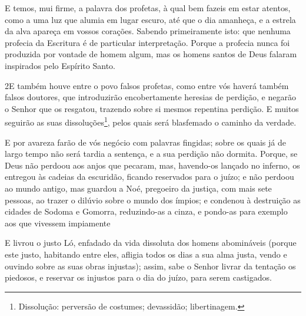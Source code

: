 E temos, mui firme, a palavra dos profetas, à qual bem fazeis em
estar atentos, como a uma luz que alumia em lugar escuro, até que o
dia amanheça, e a estrela da alva apareça em vossos corações.
Sabendo primeiramente isto: que nenhuma profecia da Escritura
é de particular interpretação. Porque a profecia nunca foi
produzida por vontade de homem algum, mas os homens santos de Deus
falaram inspirados pelo Espírito Santo.

\medskip

\lettrine{2} E também houve entre o povo falsos profetas, como
entre vós haverá também falsos doutores, que introduzirão
encobertamente heresias de perdição, e negarão o Senhor que os
resgatou, trazendo sobre si mesmos repentina perdição. E muitos
seguirão as suas dissoluções\footnote{Dissolução: perversão de
costumes; devassidão; libertinagem.}, pelos quais será blasfemado o
caminho da verdade.

E por avareza farão de vós negócio com palavras fingidas; sobre os
quais já de largo tempo não será tardia a sentença, e a sua perdição
não dormita. Porque, se Deus não perdoou aos anjos que pecaram,
mas, havendo-os lançado no inferno, os entregou às cadeias da
escuridão, ficando reservados para o juízo; e não perdoou ao
mundo antigo, mas guardou a Noé, pregoeiro da justiça, com mais sete
pessoas, ao trazer o dilúvio sobre o mundo dos ímpios; e
condenou à destruição as cidades de Sodoma e Gomorra, reduzindo-as a
cinza, e pondo-as para exemplo aos que vivessem impiamente

E livrou o justo Ló, enfadado da vida dissoluta dos homens
abomináveis (porque este justo, habitando entre eles, afligia
todos os dias a sua alma justa, vendo e ouvindo sobre as suas obras
injustas); assim, sabe o Senhor livrar da tentação os piedosos,
e reservar os injustos para o dia do juízo, para serem castigados.

